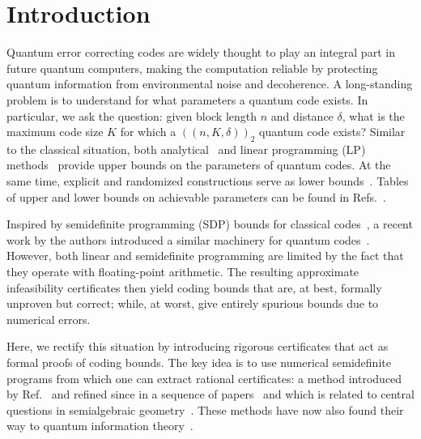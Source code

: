 \documentclass[12pt,a4paper]{amsart}
\begin{document}
\section{Introduction}
Quantum error correcting codes are widely thought to play an integral part in future quantum computers, 
making the computation reliable by protecting quantum information from environmental noise and decoherence.
% 
A long-standing problem is to understand for what parameters a quantum code exists. 
% 
In particular, we ask the question: 
given block length $n$ and distance $\delta$,
what is the maximum code size $K$ for which a 
$(\!(n,K,\delta)\!)_2$ quantum code exists?
% 
Similar to the classical situation, 
both analytical~\cite{ekert1996errorcorrectionquantumcommunication,681315,PhysRevA.69.052330,PhysRevA.81.032318,PhysRevLett.118.200502,Huber2020quantumcodesof,wei2026theorylowweightquantumcodes} and linear programming (LP) methods~\cite{PhysRevLett.78.1600,681315,796376,wei2026theorylowweightquantumcodes} provide upper bounds on the parameters of quantum codes.
% 
At the same time, explicit 
and randomized constructions 
serve as lower bounds~\cite{
quant-ph/9705052v1,  
PhysRevLett.79.953,
PhysRevLett.78.405,
rains1997quantumcodesminimumdistance,
PhysRevLett.99.130505,
Hastings2014,
Rigby_2019,
Breuckmann_2021,
Panteleev_2022}.
% 
Tables of upper and lower bounds on achievable parameters can be found in Refs.~\cite{table,Rigby_2019, HuberWyderka:ametable, Huber2020quantumcodesof}.

Inspired by semidefinite programming  (SDP) bounds for classical codes~\cite{Vallentin2019}, 
a recent work by the authors introduced a similar machinery for quantum codes~\cite{munne2025sdpboundsquantumcodes}.
% 
However, both linear and semidefinite programming are limited by the fact that they operate with floating-point arithmetic.
The resulting approximate infeasibility certificates then yield coding bounds that are, at best,
formally unproven but correct;
while, at worst, give entirely spurious bounds due to numerical errors.

Here, we rectify this situation by introducing rigorous certificates that act as formal proofs of coding bounds.
The key idea is to use numerical semidefinite programs from which one can extract rational certificates:
a method introduced by Ref.~\cite{PaPe08} and 
refined since in a sequence of papers~\cite{
KALTOFEN2008359,
doi:10.1137/20M1351692,
cohn2024optimalitysphericalcodesexact,
MAGRON2021221} and which is related to central questions in semialgebraic geometry~\cite{Scheiderer2016, LAPLAGNE2024107631}.
%
These methods have now also found their way to quantum information theory~\cite{naceur2025certifiedboundsoptimizationproblems}.
\end{document}

